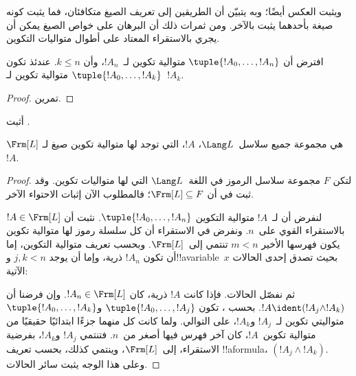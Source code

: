 \documentclass[../../../include/open-logic-section]{subfiles}
\begin{document}
ويثبت العكس أيضًا؛ وبه يتبيّن أن الطريقين إلى تعريف الصيغ
متكافئان، فما يثبت كونه صيغة بأحدهما يثبت بالآخر. ومن ثمرات ذلك
أن البرهان على خواص الصيغ يمكن أن يجري بالاستقراء المعتاد على
أطوال متواليات التكوين.

\begin{lem}
افترض أن $\tuple{!A_0,\dotsc,!A_n}$ متوالية تكوين لـ~$!A_n$، وأن
$k \leq n$. عندئذ تكون $\tuple{!A_0,\dotsc,!A_k}$ متوالية تكوين
لـ~$!A_k$.
\end{lem}

\begin{proof}
تمرين.
\end{proof}

\begin{prob}
أثبت .
\end{prob}

\begin{thm}
$\Frm[L]$ هي مجموعة جميع سلاسل~$\Lang L$، $!A$، التي توجد لها
متوالية تكوين صيغ لـ~$!A$.
\end{thm}

\begin{proof}
لتكن $F$ مجموعة سلاسل الرموز في اللغة~$\Lang L$ التي لها
متواليات تكوين. وقد ثبت في
 أن $\Frm[L] \subseteq F$؛
فالمطلوب الآن إثبات الاحتواء الآخر.

لنفرض أن لـ~$!A$ متوالية التكوين
$\tuple{!A_0,\dotsc,!A_n}$. نثبت أن $!A \in \Frm[L]$ بالاستقراء
القوي على~$n$. ونفرض في الاستقراء أن كل سلسلة رموز لها متوالية
تكوين يكون فهرسها الأخير $m < n$ تنتمي إلى~$\Frm[L]$. وبحسب تعريف
متوالية التكوين، إما أن تكون $!A_n$ ذرية، وإما أن يوجد $j,k < n$
و!!a{variable}~$x$ بحيث تصدق إحدى الحالات الآتية:
\begin{enumerate}
\end{enumerate}
ثم نفصّل الحالات. فإذا كانت $!A$ ذرية، كان
$!A_n \in \Frm[L]$. وإن فرضنا أن
$!A \ident (!A_j \land !A_k)$. بحسب
،
تكون $\tuple{!A_0,\dotsc,!A_j}$ و$\tuple{!A_0,\dotsc,!A_k}$
متواليتي تكوين لـ~$!A_j$ و$!A_k$، على التوالي. ولما كانت كل منهما جزءًا ابتدائيًا حقيقيًا من متوالية تكوين~$!A$،
كان آخر فهرس فيها أصغر من~$n$. فتنتمي $!A_j$ و$!A_k$، بفرضية
الاستقراء، إلى~$\Frm[L]$، وينتمي كذلك، بحسب تعريف !!a{formula}،
$(!A_j \land !A_k)$. وعلى هذا الوجه يثبت سائر الحالات.
\end{proof}
\end{document}
